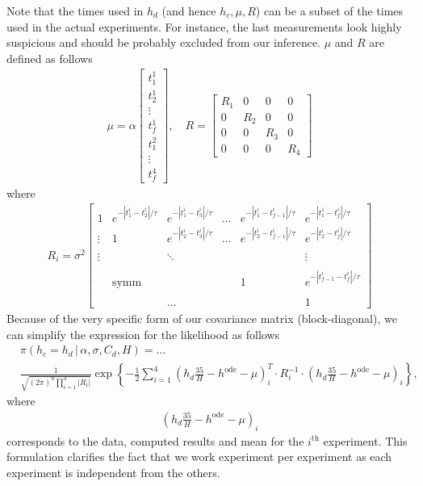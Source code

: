 \documentclass{article}
\begin{document}
Note that the times used in $h_d$ (and hence $h_c, \mu, R$) can be a subset of the times used in the actual experiments. For instance, the last measurements look highly suspicious and should be probably excluded from our inference.
$\mu$ and $R$ are defined as follows
\begin{align*}
 \mu = \alpha
 \begin{bmatrix}
  t_1^1 \\
  t_2^1 \\
  \vdots \\
  t_f^1 \\
  t_1^2 \\
  \vdots \\
  t_f^4
 \end{bmatrix}, \quad R = 
 \begin{bmatrix}
  R_1 & 0 & 0 & 0 \\
  0 & R_2 & 0 & 0 \\
  0 & 0 & R_3 & 0 \\ 
  0 & 0 & 0 & R_4
 \end{bmatrix}
\end{align*}
where
\begin{align*}
 R_i = \sigma^2
 \begin{bmatrix}
  1 & e^{-|t_1^i - t_2^i|/\tau} & e^{-|t_1^i - t_3^i|/\tau} &  \ldots & e^{-|t_1^i - t_{f-1}^i|/\tau} & e^{-|t_1^1-t_f^i|/\tau} \\
\vdots & 1 & e^{-|t_2^i - t_3^i|/\tau} &   \ldots & e^{-|t_2^i - t_{f-1}^i|/\tau} & e^{-|t_2^i - t_f^i|/\tau} \\
\\
\vdots &  &  \ddots & &  & \vdots \\
\\
& \text{symm} & & & 1 & e^{-|t_{f-1}^i - t_f^i|/\tau}  \\
\\
& & \ldots & & & 1
 \end{bmatrix}
\end{align*}
Because of the very specific form of our covariance matrix (block-diagonal), we can simplify the expression for the likelihood as follows
\begin{align*}
 & \pi(h_c = h_d \, | \, \alpha, \sigma, C_d, H) =  \ldots \\
 & \frac1{\sqrt{(2\pi)^n \prod_{i=1}^4|R_i|}}  \exp \left\{ - \frac12 \sum_{i=1}^4 \left(  h_d \frac{35}H - h^\text{ode} - \mu \right)_i^T \cdotp R_i^{-1} \cdotp \left(  h_d \frac{35}H - h^\text{ode} - \mu \right)_i \right\} ,
\end{align*}
where 
\begin{align*}
 \left(  h_d \frac{35}H - h^\text{ode} - \mu \right)_i
\end{align*}
corresponds to the data, computed results and mean for the $i^\text{th}$ experiment. This formulation clarifies the fact that we work experiment per experiment as each experiment is independent from the others.
\end{document}
